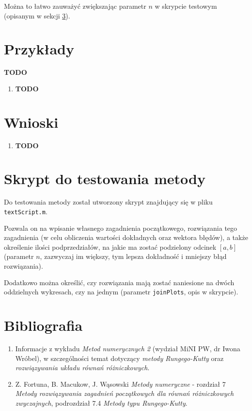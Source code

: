 \documentclass[12pt]{article}
\begin{document}
	Można to łatwo zauważyć zwiększając parametr $n$ w skrypcie testowym (opisanym w sekcji \ref{sec:testing-script}).
	
	
	
	\section{Przykłady}
	\textbf{TODO}
	
	\begin{enumerate}[label=\textbf{Przykład \arabic*}]
		\item
		\textbf{TODO}
	\end{enumerate}
	
	
	
	
	\section{Wnioski}
	\begin{enumerate}
		\item \textbf{TODO}
	\end{enumerate}
	
	
	
	\section{Skrypt do testowania metody}
	\label{sec:testing-script}
	Do testowania metody został utworzony skrypt znajdujący się w pliku \texttt{textScript.m}.
	
	Pozwala on na wpisanie własnego zagadnienia początkowego, rozwiązania tego zagadnienia (w celu obliczenia wartości dokładnych oraz wektora błędów), a także określenie ilości podprzedziałów, na jakie ma zostać podzielony odcinek $[a, b]$ (parametr $n$, zazwyczaj im większy, tym lepsza dokładność i mniejszy błąd rozwiązania).
	
	Dodatkowo można określić, czy rozwiązania mają zostać naniesione na dwóch oddzielnych wykresach, czy na jednym (parametr \texttt{joinPlots}, opis w skrypcie).
	
	
	\section{Bibliografia}
	\begin{enumerate}
		\item Informacje z wykładu \textit{Metod numerycznych 2} (wydział MiNI PW, dr Iwona Wróbel), w szczególności temat dotyczący \textit{metody Rungego-Kutty} oraz \textit{rozwiązywania układu równań różniczkowych}.
		\item Z. Fortuna, B. Macukow, J. Wąsowski \textit{Metody numeryczne} - rozdział 7 \textit{Metody rozwiązywania zagadnień początkowych dla równań różniczkowych zwyczajnych}, podrozdział 7.4 \textit{Metody typu Rungego-Kutty}.
	\end{enumerate}
	
\end{document}

